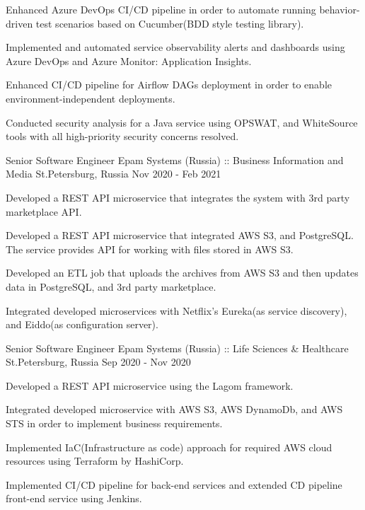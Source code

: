 \begin{cventries}
{\begin{cvitems}
    \item {Enhanced Azure DevOps CI/CD pipeline in order to automate running behavior-driven test scenarios based on Cucumber(BDD style testing library).}
    \item {Implemented and automated service observability alerts and dashboards using Azure DevOps and Azure Monitor: Application Insights.}
    \item {Enhanced CI/CD pipeline for Airflow DAGs deployment in order to enable environment-independent deployments.}
    \item {Conducted security analysis for a Java service using OPSWAT, and WhiteSource tools with all high-priority security concerns resolved.}
  \end{cvitems}
}
\cventry
{Senior Software Engineer} %
{Epam Systems (Russia) ::  Business Information and Media} %
{St.Petersburg, Russia} %
{Nov 2020 - Feb 2021} %
{
  \begin{cvitems} %
    \item {Developed a REST API microservice that integrates the system with 3rd party marketplace API.}
    \item {Developed a REST API microservice that integrated AWS S3, and PostgreSQL. The service provides API for working with files stored in AWS S3.}
    \item {Developed an ETL job that uploads the archives from AWS S3 and then updates data in PostgreSQL, and 3rd party marketplace.}
    \item {Integrated developed microservices with Netflix's Eureka(as service discovery), and Eiddo(as configuration server).}
  \end{cvitems}
}

\cventry
{Senior Software Engineer} %
{Epam Systems (Russia) :: Life Sciences \& Healthcare} %
{St.Petersburg, Russia} %
{Sep 2020 - Nov 2020 } %
{
  \begin{cvitems} %
    \item {Developed a REST API microservice using the Lagom framework.}
    \item {Integrated developed microservice with AWS S3, AWS DynamoDb, and AWS STS in order to implement business requirements.}
    \item {Implemented IaC(Infrastructure as code) approach for required AWS cloud resources using Terraform by HashiCorp.}
    \item {Implemented CI/CD pipeline for back-end services and extended CD pipeline front-end service using Jenkins.}
  \end{cvitems}
}


\end{cventries}
